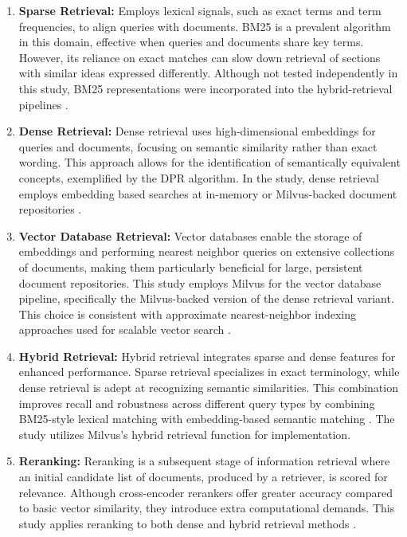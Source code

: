 \begin{enumerate}
    \item \textbf{Sparse Retrieval:} Employs lexical signals, such as exact terms and term frequencies, to align queries with documents. \ac{BM25} is a prevalent algorithm in this domain, effective when queries and documents share key terms. However, its reliance on exact matches can slow down retrieval of sections with similar ideas expressed differently. Although not tested independently in this study, \ac{BM25} representations were incorporated into the hybrid-retrieval pipelines \cite{robertson2009bm25}.
    
    \item \textbf{Dense Retrieval:} Dense retrieval uses high-dimensional embeddings for queries and documents, focusing on semantic similarity rather than exact wording. This approach allows for the identification of semantically equivalent concepts, exemplified by the \ac{DPR} algorithm. In the study, dense retrieval employs embedding based searches at in-memory or Milvus-backed document repositories \cite{karpukhin2020dpr}.
    
    \item \textbf{Vector Database Retrieval:} Vector databases enable the storage of embeddings and performing nearest neighbor queries on extensive collections of documents, making them particularly beneficial for large, persistent document repositories. This study employs Milvus for the vector database pipeline, specifically the Milvus-backed version of the dense retrieval variant. This choice is consistent with approximate nearest-neighbor indexing approaches used for scalable vector search \cite{johnson2017faiss,malkov2018hnsw}.
    
    \item \textbf{Hybrid Retrieval:} Hybrid retrieval integrates sparse and dense features for enhanced performance. Sparse retrieval specializes in exact terminology, while dense retrieval is adept at recognizing semantic similarities. This combination improves recall and robustness across different query types by combining BM25-style lexical matching with embedding-based semantic matching \cite{robertson2009bm25,karpukhin2020dpr}. The study utilizes Milvus's hybrid retrieval function for implementation.
    
    \item \textbf{Reranking:} Reranking is a subsequent stage of information retrieval where an initial candidate list of documents, produced by a retriever, is scored for relevance. Although cross-encoder rerankers offer greater accuracy compared to basic vector similarity, they introduce extra computational demands. This study applies reranking to both dense and hybrid retrieval methods \cite{nogueira2019passage,khattab2020colbert}.
\end{enumerate}

